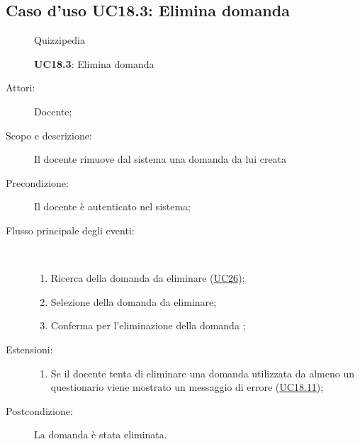 \subsection{Caso d'uso UC18.3: Elimina domanda}
\begin{figure}[H]
	\centering
	\begin{resizedtikzpicture}{\textwidth}
		\begin{umlsystem}[x=0, fill=lightgray!20]{Quizzipedia}
		\end{umlsystem}
	\end{resizedtikzpicture}
	\caption{\textbf{UC18.3}: Elimina domanda}
	\label{UC18.3}
\end{figure}
\begin{description}
	\item[Attori:] Docente;
	\item[Scopo e descrizione:] Il docente rimuove dal sistema una domanda da lui creata
	\item[Precondizione:] Il docente è autenticato nel sistema;
	
	\item[Flusso principale degli eventi:] \ 
	\begin{enumerate}
		\item Ricerca della domanda da eliminare (\hyperlink{UC26}{UC26});
		\item Selezione della domanda da eliminare;
		\item Conferma per l'eliminazione della domanda	;
		
	\end{enumerate}
	\item[Estensioni:]
	\begin{enumerate}
		\item Se il docente tenta di eliminare una domanda utilizzata da almeno un questionario viene mostrato un messaggio di errore (\hyperlink{UC18.11}{UC18.11});
		
	\end{enumerate}
	\item[Postcondizione:] La domanda è stata eliminata.
\end{description}
\hypertarget{UC18.4}{}
